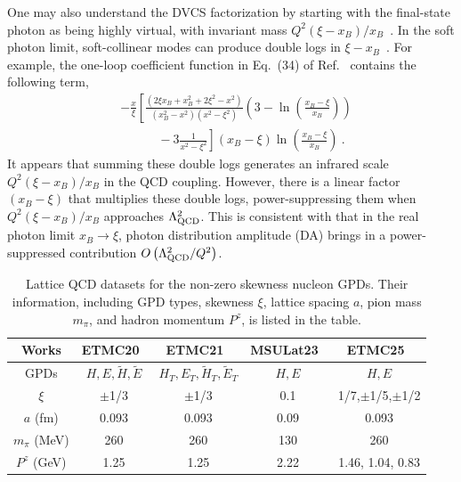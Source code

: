 \documentclass[prl,aps,twocolumn,preprintnumbers, showpacs, nofootinbib,superscriptaddress,notitlepage]{revtex4-1}
\begin{document}
One may also understand the DVCS factorization by starting with the final-state photon as being highly virtual, with invariant mass $Q^2 (\xi-x_B)/x_B$~\cite{Ji:1998xh}. In the soft 
photon limit, soft-collinear modes can produce double logs in $\xi-x_B$~\cite{Schoenleber:2022myb}. For example, the one-loop coefficient function in Eq.~(34) of Ref.~\cite{Ji:1998xh} contains the following term,
\begin{align}
&-\frac{x}{\xi}\left[\frac{\left(2 \xi  x_B+x_B^2+2 \xi^2-x^2\right)}{\left(x_B^2-x^2\right) \left(x^2-\xi^2\right)}\left(3-\ln \left(\frac{x_B-\xi}{x_B}\right)\right) \right.\nonumber\\
&\left. \quad\quad\quad  -3 \frac{1}{x^2-\xi^2}\right] \left(x_B-\xi \right) \ln \left(\frac{x_B-\xi}{x_B}\right)    \ .
\end{align}
It appears that summing these double logs generates an infrared scale $Q^2 (\xi-x_B)/x_B$ in the QCD coupling. However, there is a linear factor $(x_B-\xi)$ that multiplies these double logs, power-suppressing them when $Q^2(\xi-x_B)/x_B$ approaches $\Lambda_{\rm QCD}^2$. This is consistent with that in the real photon limit  $x_B \rightarrow \xi$, photon distribution amplitude (DA) brings in a power-suppressed contribution $O\left(\Lambda_{\rm QCD}^2/Q^2\right)$.  


\begin{table}[htbp]
    \centering
    \begin{tabular}{|c|c|c|c|c|}
      \hline
      Works & ETMC20~\cite{Alexandrou:2020zbe} & ETMC21~\cite{Alexandrou:2021bbo} & MSULat23~\cite{Holligan:2023jqh} &  ETMC25~\cite{Chu:2025kew} \\ \hline 
      GPDs & $H,E,\tilde{H},\tilde{E}$ & $H_T,E_T,\tilde{H}_T,\tilde{E}_T$ & $H,E$ & $H,E$ \\ \hline 
      $\xi$ & $\pm$1/3 & $\pm$1/3 & 0.1 & 1/7,$\pm$1/5,$\pm$1/2 \\ \hline
      $a$ (fm) & 0.093 & 0.093 & 0.09 & 0.093 \\
      \hline
      $m_{\pi}$ (MeV) & 260 & 260 & 130 & 260 \\
      \hline
      $P^z$ (GeV) & 1.25 & 1.25 & 2.22 & 1.46, 1.04, 0.83 \\ 
      \hline
    \end{tabular}
    \caption{Lattice QCD datasets for the non-zero skewness nucleon GPDs. Their information, including GPD types, skewness $\xi$, lattice spacing $a$, pion mass $m_{\pi}$, and hadron momentum $P^z$, is listed in the table. }
    \label{tab:setlatdat}
\end{table}
\end{document}
